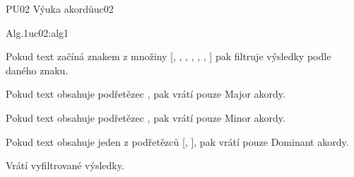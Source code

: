 \begin{usecase}{PU02 Výuka akordů}{uc02}
    \begin{scenario}{Alg.1}{uc02:alg1}
        \item Pokud text začíná znakem z množiny [, , , , , , ] pak filtruje výsledky podle daného znaku.
        \item Pokud text obsahuje podřetězec , pak vrátí pouze Major akordy.
        \item Pokud text obsahuje podřetězec , pak vrátí pouze Minor akordy.
        \item Pokud text obsahuje jeden z podřetězců [, ], pak vrátí pouze Dominant akordy.
        \item Vrátí vyfiltrované výsledky.        
    \end{scenario}
\end{usecase}